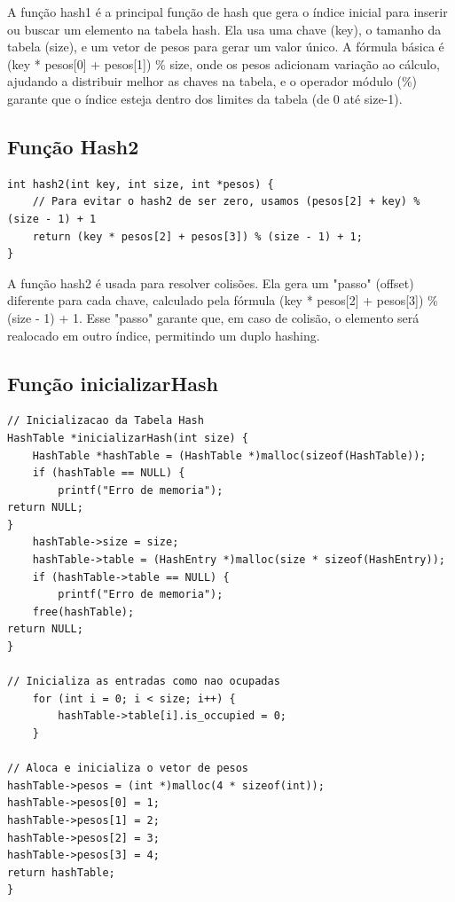 \documentclass{article}
\begin{document}
\par A função hash1 é a principal função de hash que gera o índice inicial para inserir ou buscar um elemento na tabela hash. Ela usa uma chave (key), o tamanho da tabela (size), e um vetor de pesos para gerar um valor único. A fórmula básica é (key * pesos[0] + pesos[1]) \% size, onde os pesos adicionam variação ao cálculo, ajudando a distribuir melhor as chaves na tabela, e o operador módulo (\%) garante que o índice esteja dentro dos limites da tabela (de 0 até size-1).

\subsection{Função Hash2}
\begin{lstlisting}[caption={},label={lst:cod1},language={[x86masm]Assembler}]
int hash2(int key, int size, int *pesos) {
    // Para evitar o hash2 de ser zero, usamos (pesos[2] + key) % (size - 1) + 1
    return (key * pesos[2] + pesos[3]) % (size - 1) + 1;
}
\end{lstlisting}

\par A função hash2 é usada para resolver colisões. Ela gera um "passo" (offset) diferente para cada chave, calculado pela fórmula (key * pesos[2] + pesos[3]) \% (size - 1) + 1. Esse "passo" garante que, em caso de colisão, o elemento será realocado em outro índice, permitindo um duplo hashing.

\subsection{Função inicializarHash}

\begin{lstlisting}[caption={},label={lst:cod1},language={[x86masm]Assembler}]
// Inicializacao da Tabela Hash
HashTable *inicializarHash(int size) {
    HashTable *hashTable = (HashTable *)malloc(sizeof(HashTable));
    if (hashTable == NULL) {
        printf("Erro de memoria");
return NULL;
}
    hashTable->size = size;
    hashTable->table = (HashEntry *)malloc(size * sizeof(HashEntry));
    if (hashTable->table == NULL) {
        printf("Erro de memoria");
    free(hashTable);
return NULL;
}

// Inicializa as entradas como nao ocupadas
    for (int i = 0; i < size; i++) {
        hashTable->table[i].is_occupied = 0;
    }

// Aloca e inicializa o vetor de pesos
hashTable->pesos = (int *)malloc(4 * sizeof(int));
hashTable->pesos[0] = 1;
hashTable->pesos[1] = 2;
hashTable->pesos[2] = 3;
hashTable->pesos[3] = 4;
return hashTable;
}
\end{lstlisting}
\end{document}
